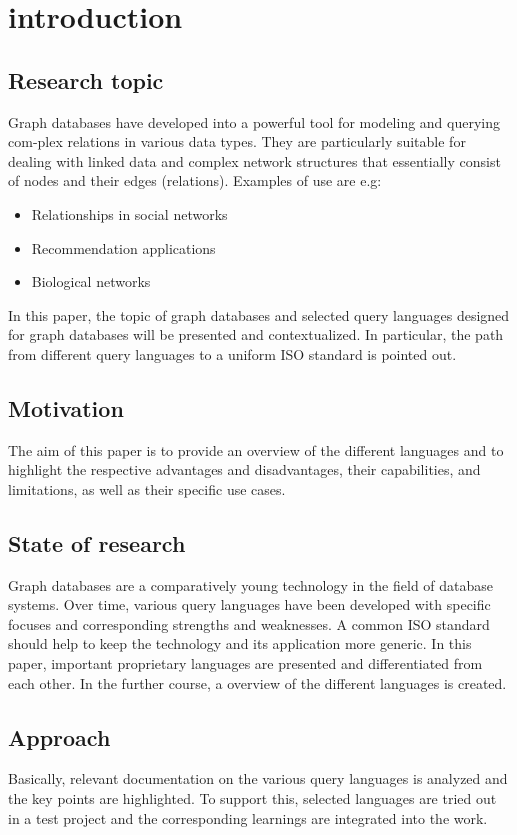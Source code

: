 \chapter{introduction}
\label{ch:intro}

\section{Research topic}
\label{sec:intro:Forschungsthema}
Graph databases have developed into a powerful tool for modeling and querying com-plex relations in various data types. 
They are particularly suitable for dealing with linked data and complex network structures that essentially consist of nodes and their edges (relations). 
Examples of use are e.g:
\begin{itemize}
	\item Relationships in social networks
	\item Recommendation applications
	\item Biological networks
\end{itemize}
In this paper, the topic of graph databases and selected query languages designed for graph databases will be presented and contextualized. 
In particular, the path from different query languages to a uniform ISO standard is pointed out.


\section{Motivation}
\label{sec:intro:Motivation}
The aim of this paper is to provide an overview of the different languages and to highlight the respective advantages and disadvantages, 
their capabilities, and limitations, as well as their specific use cases. 

\section{State of research}
\label{sec:intro:State of researc}
Graph databases are a comparatively young technology in the field of database systems. 
Over time, various query languages have been developed with specific focuses and corresponding strengths and weaknesses.
A common ISO standard should help to keep the technology and its application more generic.
In this paper, important proprietary languages are presented and differentiated from each other. 
In the further course, a overview of the different languages is created.

\section{Approach}
\label{sec:intro:Approach}
Basically, relevant documentation on the various query languages is analyzed and the key points are highlighted. 
To support this, selected languages are tried out in a test project and the corresponding learnings are integrated into the work.



